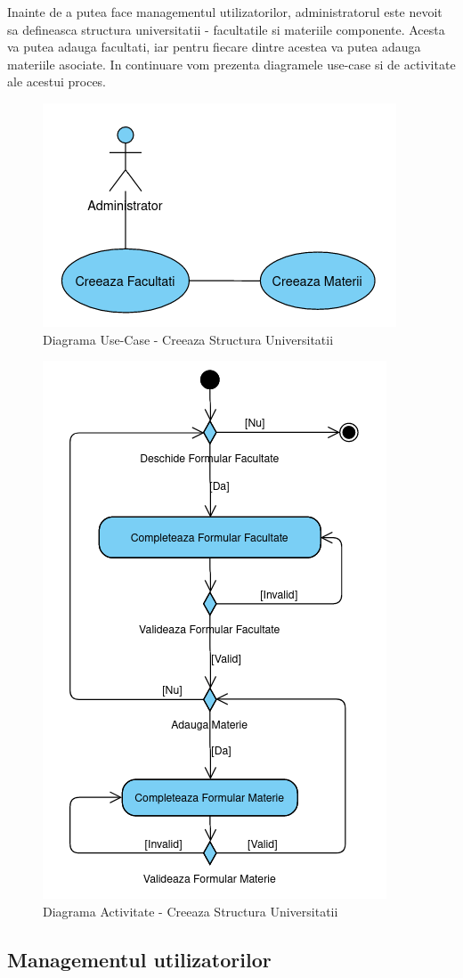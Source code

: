 \documentclass[12pt, a4paper, oneside, romanian]{teza-upb}
\begin{document}
Inainte de a putea face managementul utilizatorilor, administratorul este nevoit sa defineasca structura universitatii - facultatile si materiile componente. Acesta va putea adauga facultati, iar pentru fiecare dintre acestea va putea adauga materiile asociate. In continuare vom prezenta diagramele use-case si de activitate ale acestui proces.

\begin{figure}[H]
\centering
\includegraphics*[width=0.5\columnwidth]{diagrama-use-case-creeaza-structura-universitatii}
\caption{Diagrama Use-Case - Creeaza Structura Universitatii}
\label{diagrama-use-case-creeaza-structura-universitatii}
\end{figure}


\begin{figure}[H]
\centering
\includegraphics*[width=0.5\columnwidth]{diagrama-activitate-creeaza-structura-universitatii}
\caption{Diagrama Activitate - Creeaza Structura Universitatii}
\label{diagrama-activitate-creeaza-structura-universitatii}
\end{figure}

\subsection{Managementul utilizatorilor}
\end{document}
